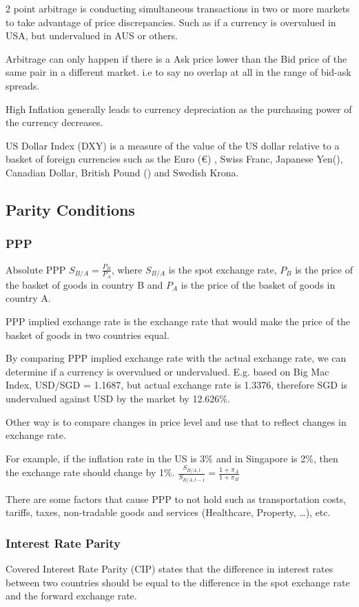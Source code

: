 2 point arbitrage is conducting simultaneous transactions in two or more markets to take advantage of price discrepancies. Such as if a currency is overvalued in USA, but undervalued in AUS or others.

Arbitrage can only happen if there is a Ask price lower than the Bid price of the same pair in a different market. i.e to say no overlap at all in the range of bid-ask spreads.

High Inflation generally leads to currency depreciation as the purchasing power of the currency decreases.

US Dollar Index (DXY) is a measure of the value of the US dollar relative to a basket of foreign currencies such as the Euro (\euro) , Swiss Franc, Japanese Yen(\textyen), Canadian Dollar, British Pound (\textsterling) and Swedish Krona.


\subsection{Parity Conditions}
\subsubsection{PPP}
Absolute PPP $S_{B/A} = \frac{P_B}{P_A}$, where $S_{B/A}$ is the spot exchange rate, $P_B$ is the price of the basket of goods in country B and $P_A$ is the price of the basket of goods in country A.

PPP implied exchange rate is the exchange rate that would make the price of the basket of goods in two countries equal.

By comparing PPP implied exchange rate with the actual exchange rate, we can determine if a currency is overvalued or undervalued. E.g. based on Big Mac Index, USD/SGD = 1.1687, but actual exchange rate is 1.3376, therefore SGD is undervalued against USD by the market by 12.626\%.

Other way is to compare changes in price level and use that to reflect changes in exchange rate.

For example, if the inflation rate in the US is 3\% and in Singapore is 2\%, then the exchange rate should change by 1\%. $\frac{S_{B/A, t}}{S_{B/A, t - 1}} = \frac{1+\pi_A}{1+\pi_B}$

There are some factors that cause PPP to not hold such as transportation costs, tariffs, taxes, non-tradable goods and services (Healthcare, Property, \ldots), etc.

\subsubsection{Interest Rate Parity}
Covered Interest Rate Parity (CIP) states that the difference in interest rates between two countries should be equal to the difference in the spot exchange rate and the forward exchange rate.

